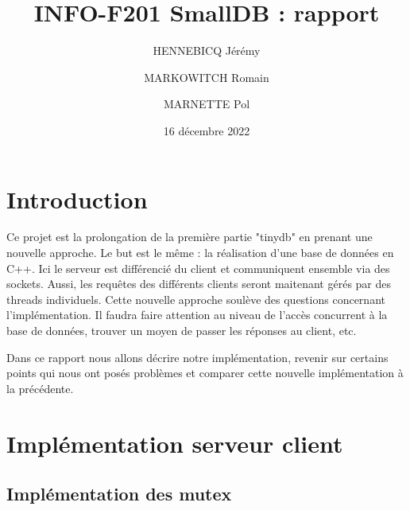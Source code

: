\documentclass[utf8]{article}
\title{INFO-F201 SmallDB : rapport}
\author{HENNEBICQ Jérémy\and MARKOWITCH Romain \and MARNETTE Pol}
\date{16 décembre 2022}
\begin{document}
\maketitle
\tableofcontents

\newpage


\section{Introduction}

Ce projet est la prolongation de la première partie "tinydb" en prenant une nouvelle approche. Le but est le même : la réalisation d'une base de données en C++. Ici le serveur est différencié du client et communiquent ensemble via des sockets. Aussi, les requêtes des différents clients seront maitenant gérés par des threads individuels. Cette nouvelle approche soulève des questions concernant l'implémentation. Il faudra faire attention au niveau de l'accès concurrent à la base de données, trouver un moyen de passer les réponses au client, etc.

Dans ce rapport nous allons décrire notre implémentation, revenir sur certains points qui nous ont posés problèmes et comparer cette nouvelle implémentation à la précédente.

\section{Implémentation serveur client}

\subsection{Implémentation des mutex}
\end{document}
